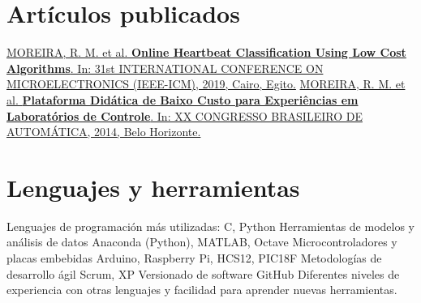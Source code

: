 \documentclass[espanol]{cv-style}          %
\begin{document}
\section{Artículos publicados}
\vspace{-0.3cm}
\begin{entrylist}
\entry
{}
{}
{\vspace{-0.4cm}}
{\href{https://doi.org/10.1109/ICM48031.2019.9021277}{MOREIRA, R. M. et al. \textbf{Online Heartbeat Classification Using Low Cost Algorithms}. In: 31st INTERNATIONAL CONFERENCE ON MICROELECTRONICS (IEEE-ICM), 2019, Cairo, Egito.}}
{}
\entry
{}
{}
{\vspace{-0.01cm}}
{\href{http://www.swge.inf.br/CBA2014/anais/PDF/1569927865.pdf}{MOREIRA, R. M. et al. \textbf{Plataforma Didática de Baixo Custo para Experiências em Laboratórios de Controle}. In: XX CONGRESSO BRASILEIRO DE AUTOMÁTICA, 2014, Belo Horizonte.}}
{}
\end{entrylist}
{\vspace{-0.4cm}}

\section{Lenguajes y herramientas}
\vspace{-0.3cm}
\begin{entrylist}
\entry
{}
{Lenguajes de programación más utilizadas:}
{C, Python}
{\vspace{-0.5cm}}
\entry
{}
{Herramientas de modelos y análisis de datos}
{Anaconda (Python), MATLAB, Octave}
{\vspace{-0.5cm}}
\entry
{}
{Microcontroladores y placas embebidas}
{Arduino, Raspberry Pi, HCS12, PIC18F}
{\vspace{-0.5cm}}
\entry
{}
{Metodologías de desarrollo ágil}
{Scrum, XP}
{\vspace{-0.5cm}}
\entry
{}
{Versionado de software}
{GitHub}
{\vspace{-0.5cm}}
\entry
{}
{Diferentes niveles de experiencia con otras lenguajes y facilidad para aprender nuevas herramientas. }
{}
{\vspace{-4.0cm}}
\end{entrylist}
\end{document}
